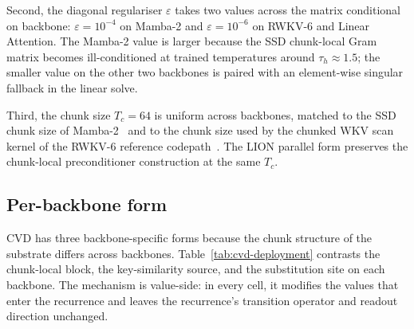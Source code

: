 Second, the diagonal regulariser $\varepsilon$ takes two values
across the matrix conditional on backbone: $\varepsilon = 10^{-4}$
on Mamba-2 and $\varepsilon = 10^{-6}$ on RWKV-6 and Linear
Attention. The Mamba-2 value is larger because the SSD chunk-local
Gram matrix becomes ill-conditioned at trained temperatures around
$\tau_{h} \approx 1.5$; the smaller value on the other two
backbones is paired with an element-wise singular fallback in the
linear solve.

Third, the chunk size $T_{c} = 64$ is uniform across backbones,
matched to the SSD chunk size of
Mamba-2~\cite{dao2024transformers} and to the chunk size used by
the chunked WKV scan kernel of the RWKV-6 reference
codepath~\cite{peng2024eaglefinch, rwkv2024block}. The LION
parallel form preserves the chunk-local preconditioner
construction at the same $T_{c}$.

\subsection{Per-backbone form}

CVD has three backbone-specific forms because the chunk structure
of the substrate differs across backbones.
Table~\ref{tab:cvd-deployment} contrasts the chunk-local block,
the key-similarity source, and the substitution site on each
backbone. The mechanism is value-side: in every cell, it modifies
the values that enter the recurrence and leaves the recurrence's
transition operator and readout direction unchanged.

